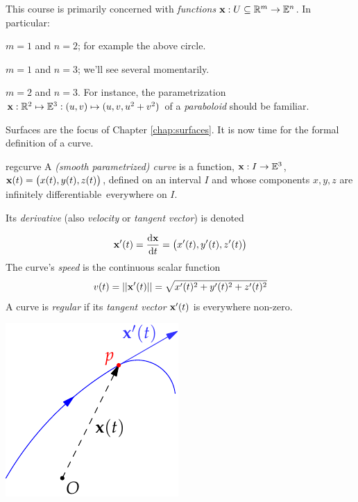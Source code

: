 
This course is primarily concerned with \emph{functions} $\vx:U\subseteq\R^m\to\E^n$. In particular:
\begin{description}\itemsep0pt
	\item[\normalfont\emph{Plane curves}:] $m=1$ and $n=2$; for example the above circle.
	\item[\normalfont\emph{Spacecurves}:] $m=1$ and $n=3$; we'll see several momentarily.
	\item[\normalfont\emph{Surfaces}:] $m=2$ and $n=3$. For instance, the parametrization $\vx:\R^2\mapsto\E^3:(u,v)\mapsto (u,v,u^2+v^2)$ of a \emph{paraboloid} should be  familiar.
\end{description}

Surfaces are the focus of Chapter \ref{chap:surfaces}. It is now time for the formal definition of a curve.

\goodbreak
 


\begin{defn}{}{regcurve}
	A \emph{(smooth parametrized) curve} is a function, $\vx:I\to\E^3$, $\vx(t)=\bigl(x(t),y(t),z(t)\bigr)$, defined on an interval $I$ and whose components $x,y,z$ are infinitely differentiable\footnotemark\ everywhere on $I$.\par
	Its \emph{derivative} (also \emph{velocity} or \emph{tangent vector}) is denoted\par
	\begin{minipage}[t]{0.7\linewidth}\vspace{-10pt}
		\[
			\vx'(t)=\diff[\vx]{t}=\bigl(x'(t),y'(t),z'(t)\bigr)
		\]
		The curve's \emph{speed} is the continuous scalar function 
		\[
			v(t)=\Nm{\vx'(t)}=\sqrt{x'(t)^2+y'(t)^2+z'(t)^2}
		\]
		A curve is \emph{regular} if its \emph{tangent vector} $\vx'(t)$ is everywhere non-zero. 
	\end{minipage}
	\hfill
	\begin{minipage}[t]{0.29\linewidth}\vspace{0pt}
		\flushright\includegraphics{curves-tangent-vector}
	\end{minipage}
\end{defn}

